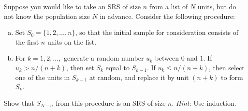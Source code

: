 \documentclass{homework}
\begin{document}
\begin{longproblem}
Suppose you would like to take an SRS of size $n$ from a list of $N$ units, but do not know the population size $N$ in advance.  Consider the following procedure:
\begin{enumerate}[(a)]
  \item Set $S_0 = \{1,2,\dots,n\}$, so that the initial sample for consideration consists of the first $n$ units on the list.
  \item For $k=1,2,\dots,$ generate a random number $u_k$ between $0$ and $1$.  If $u_k > n/(n+k)$, then set $S_k$ equal to $S_{k-1}$.  If $u_k\le n/(n+k)$, then select one of the units in $S_{k-1}$ at random, and replace it by unit $(n+k)$ to form $S_k$.
\end{enumerate}
Show that $S_{N-n}$ from this procedure is an SRS of size $n$. \emph{Hint:} Use induction.
\end{longproblem}
\end{document}
